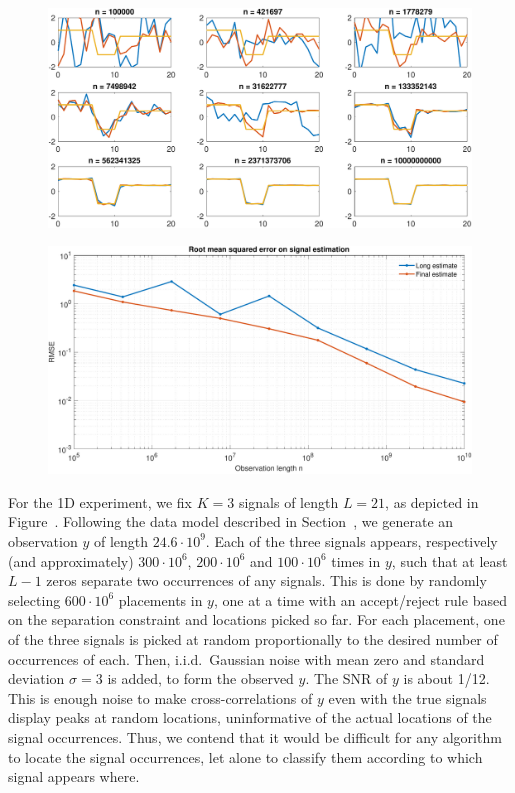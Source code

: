 \documentclass[english,11pt]{article}
\newcommand{\TODO}[1]{{\color{red}{[#1]}}}
\numberwithin{equation}{section}
\theoremstyle{plain}
\theoremstyle{definition}
\theoremstyle{remark}
\theoremstyle{plain}
\theoremstyle{remark}
\theoremstyle{plain}
\theoremstyle{plain}
\begin{document}

\TODO{Revise to explain $K = 1$ experiment first, then explain $K = 3$.}

\begin{figure}[t]
	\centering
	\includegraphics[width=0.7\linewidth]{XP_1D_homogeneous/progressive_n10000000000_107521}
	\caption{\TODO{...}}
	\label{fig:1Dhomosignals}
\end{figure}

\begin{figure}[t]
	\centering
	\includegraphics[width=0.7\linewidth]{XP_1D_homogeneous/progressive_RMSE_n10000000000_107521}
	\caption{\TODO{...}}
	\label{fig:1DhomoRMSE}
\end{figure}


For the 1D experiment, we fix $K = 3$ signals of length $L = 21$, as depicted in Figure~\TODO{ref}. Following the data model described in Section~\TODO{ref}, we generate an observation $y$ of length $24.6 \cdot 10^9$. Each of the three signals appears, respectively (and approximately) $300 \cdot 10^6$, $200 \cdot 10^6$ and $100 \cdot 10^6$ times in $y$, such that at least $L-1$ zeros separate two occurrences of any signals. This is done by randomly selecting $600 \cdot 10^6$ placements in $y$, one at a time with an accept/reject rule based on the separation constraint and locations picked so far. For each placement, one of the three signals is picked at random proportionally to the desired number of occurrences of each. Then, i.i.d.\ Gaussian noise with mean zero and standard deviation $\sigma = 3$ is added, to form the observed $y$. The SNR of $y$
is about 1/12.
This is enough noise to make cross-correlations of $y$ even with the true signals display peaks at random locations, uninformative of the actual locations of the signal occurrences. Thus, we contend that it would be difficult for any algorithm to locate the signal occurrences, let alone to classify them according to which signal appears where.
\end{document}
